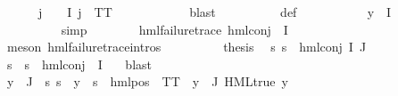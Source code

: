 \begin{isabellebody}
\ {\isachardoublequoteopen}{\isasymPsi}\ {\isacharbackquote}{\kern0pt}\ {\isacharbraceleft}{\kern0pt}{\isacharbraceright}{\kern0pt}\ {\isacharequal}{\kern0pt}\ {\isacharbraceleft}{\kern0pt}{\isacharbraceright}{\kern0pt}{\isachardoublequoteclose}\ {\isachardoublequoteopen}{\isasymforall}j\ {\isasymin}\ {\isasymPsi}\ {\isacharbackquote}{\kern0pt}\ I{\isachardot}{\kern0pt}\ j\ {\isacharequal}{\kern0pt}\ TT{\isachardoublequoteclose}\ \isanewline
\ \ \ \ \ \ \ \ \ \isamarkupfalse%
\ blast\isanewline
\ \ \ \ \ \ \ \ \isamarkupfalse%
\ {\isasymPsi}{\isacharunderscore}{\kern0pt}def\ \isanewline
\ \ \ \ \ \ \ \ \isamarkupfalse%
\ {\isacartoucheopen}y\ {\isasymin}\ {\isasymPhi}{\isacharbackquote}{\kern0pt}I{\isacartoucheclose}\ \isanewline
\ \ \ \ \ \ \ \ \isamarkupfalse%
\ simp\isanewline
\ \ \ \ \ \ \isamarkupfalse%
\ {\isachardoublequoteopen}hml{\isacharunderscore}{\kern0pt}failure{\isacharunderscore}{\kern0pt}trace\ {\isacharparenleft}{\kern0pt}hml{\isacharunderscore}{\kern0pt}conj\ {\isacharbraceleft}{\kern0pt}{\isacharbraceright}{\kern0pt}\ I\ {\isasymPsi}{\isacharparenright}{\kern0pt}{\isachardoublequoteclose}\ \isanewline
\ \ \ \ \ \ \ \ \isamarkupfalse%
\ {\isacharparenleft}{\kern0pt}meson\ hml{\isacharunderscore}{\kern0pt}failure{\isacharunderscore}{\kern0pt}trace{\isachardot}{\kern0pt}intros{\isacharparenleft}{\kern0pt}{}{\isacharparenright}{\kern0pt}{\isacharparenright}{\kern0pt}\isanewline
\ \ \ \ \ \ \isamarkupfalse%
\ \isamarkupfalse%
\ {\isacharquery}{\kern0pt}thesis\ \isamarkupfalse%
\ {\isacartoucheopen}{\isasymforall}s{\isachardot}{\kern0pt}\ {\isasymnot}s\ {\isasymTurnstile}\ {\isacharparenleft}{\kern0pt}hml{\isacharunderscore}{\kern0pt}conj\ I\ J\ {\isasymPhi}{\isacharparenright}{\kern0pt}{\isacartoucheclose}\ \isanewline
\ \ \ \ \ \ \ \ \isamarkupfalse%
\ {\isacartoucheopen}{\isasymforall}s{\isachardot}{\kern0pt}\ {\isasymnot}\ s\ {\isasymTurnstile}\ hml{\isacharunderscore}{\kern0pt}conj\ {\isacharbraceleft}{\kern0pt}{\isacharbraceright}{\kern0pt}\ I\ {\isasymPsi}{\isacartoucheclose}\ \isamarkupfalse%
\ blast\isanewline
\ \ \ \ \isamarkupfalse%
\isanewline
\ \ \ \ \ \ \isamarkupfalse%
\ {}\isanewline
\ \ \ \ \ \ \isamarkupfalse%
\ {\isachardoublequoteopen}{\isasymforall}y\ {\isasymin}\ {\isasymPhi}{\isacharbackquote}{\kern0pt}J{\isachardot}{\kern0pt}\ {\isasymexists}{\isasymalpha}{\isachardot}{\kern0pt}\ {\isacharparenleft}{\kern0pt}{\isasymforall}s{\isachardot}{\kern0pt}\ {\isacharparenleft}{\kern0pt}s\ {\isasymTurnstile}\ y{\isacharparenright}{\kern0pt}\ {\isasymlongleftrightarrow}\ {\isacharparenleft}{\kern0pt}s\ {\isasymTurnstile}\ {\isacharparenleft}{\kern0pt}hml{\isacharunderscore}{\kern0pt}pos\ {\isasymalpha}\ TT{\isacharparenright}{\kern0pt}{\isacharparenright}{\kern0pt}{\isacharparenright}{\kern0pt}{\isachardoublequoteclose}\ {\isacharbar}{\kern0pt}\ {\isachardoublequoteopen}{\isacharparenleft}{\kern0pt}{\isasymexists}y{\isasymin}{\isasymPhi}\ {\isacharbackquote}{\kern0pt}\ J{\isachardot}{\kern0pt}\ HML{\isacharunderscore}{\kern0pt}true\ y{\isacharparenright}{\kern0pt}{\isachardoublequoteclose}\isanewline

\end{isabellebody}

